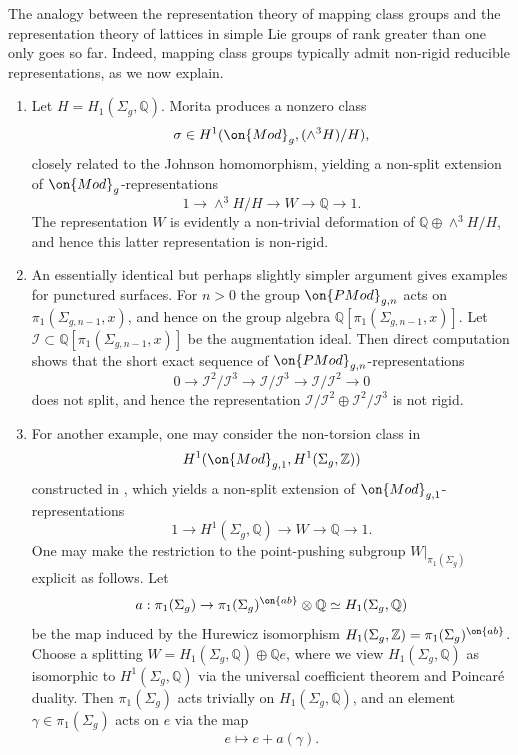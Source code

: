 \begin{example}
\notready\label{non-rigid-examples}
The analogy between the representation theory of mapping class groups and the representation theory of lattices in simple Lie groups of rank greater than one only goes so far. Indeed, mapping class groups typically admit non-rigid reducible representations, as we now explain.
\begin{enumerate}
\item Let $H=H_1(\Sigma_g, \mathbb{Q})$. Morita \cite{morita1993extension} produces a nonzero class $$\sigma\in H^1(\on{Mod}_g, (\wedge^3 H)/H),$$ closely related to the Johnson homomorphism, yielding a non-split extension of $\on{Mod}_g$-representations $$1\to \wedge^3H/H\to W\to \mathbb{Q}\to 1.$$ The representation $W$ is evidently a non-trivial deformation of $\mathbb{Q}\oplus \wedge^3H/H$, and hence this latter representation is non-rigid.

\item An essentially identical but perhaps slightly simpler argument gives examples for punctured surfaces. For $n>0$ the group $\on{PMod}_{g,n}$ acts on $\pi_1(\Sigma_{g,n-1}, x)$, and hence on the group algebra $\mathbb{Q}[\pi_1(\Sigma_{g,n-1}, x)]$. Let $\mathscr{I}\subset \mathbb{Q}[\pi_1(\Sigma_{g,n-1}, x)]$ be the augmentation ideal. Then direct computation shows that the short exact sequence of $\on{PMod}_{g,n}$-representations $$0\to \mathscr{I}^2/\mathscr{I}^3\to \mathscr{I}/\mathscr{I}^3\to \mathscr{I}/\mathscr{I}^2\to 0$$ does not split, and hence the representation $\mathscr{I}/\mathscr{I}^2\oplus \mathscr{I}^2/\mathscr{I}^3$ is not rigid.

\item \label{h1-example} For another example, one may consider the non-torsion class in $$H^1(\on{Mod}_{g,1}, H^1(\Sigma_g, \mathbb{Z}))$$ constructed in \cite[Proposition 6.4]{morita1989families}, which yields a non-split extension of $\on{Mod}_{g,1}$-representations $$1\to H^1(\Sigma_g, \mathbb{Q})\to W\to \mathbb{Q}\to 1.$$ One may make the restriction to the point-pushing subgroup $W|_{\pi_1(\Sigma_g)}$ explicit as follows. Let $$a: \pi_1(\Sigma_g)\to \pi_1(\Sigma_g)^{\on{ab}}\otimes\mathbb{Q}\simeq H_1(\Sigma_g, \mathbb{Q})$$  be the map induced by the Hurewicz isomorphism $H_1(\Sigma_g, \mathbb{Z})=\pi_1(\Sigma_g)^{\on{ab}}$. Choose a splitting $W=H_1(\Sigma_g, \mathbb{Q})\oplus \mathbb{Q}e$, where we view $H_1(\Sigma_g, \mathbb{Q})$ as isomorphic to $H^1(\Sigma_g, \mathbb{Q})$ via the universal coefficient theorem and Poincar\'e duality. Then $\pi_1(\Sigma_g)$ acts trivially on $H_1(\Sigma_g, \mathbb{Q})$, and an element $\gamma\in\pi_1(\Sigma_g)$ acts on $e$ via the map $$e\mapsto e+a(\gamma).$$
\end{enumerate}
\end{example}

